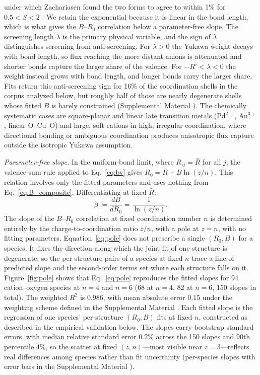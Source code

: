 \documentclass[aps,prmaterials,twocolumn,10pt,superscriptaddress,floatfix]{revtex4-2}
\newcommand{\runinsec}[1]{\medskip\emph{#1}}
\begin{document}
under which Zachariasen found the two forms to agree to within 1\%
for $0.5<S<2$ \cite{Zachariasen1978}.  We retain the exponential
because it is linear in the bond length, which is what gives the
$B$--$R_0$ correlation below a parameter-free slope.  The screening
length $\lambda$ is the
primary physical variable, and the sign of $\lambda$ distinguishes
screening from anti-screening.  For $\lambda>0$ the Yukawa weight
decays with bond length, so flux reaching the more distant anions is
attenuated and shorter bonds capture the larger share of the valence.
For $-R'<\lambda<0$ the weight instead grows with bond length, and
longer bonds carry the larger share.  Fits return this anti-screening
sign for 16\% of the coordination shells in the corpus analyzed below,
but roughly half of those are nearly degenerate shells whose fitted
$B$ is barely constrained (Supplemental Material \cite{suppmat}).  The
chemically systematic cases are square-planar and linear late
transition metals (Pd$^{2+}$, Au$^{3+}$, linear O--Cu--O) and large,
soft cations in high, irregular coordination, where directional
bonding or ambiguous coordination produces anisotropic flux capture
outside the isotropic Yukawa assumption.

\runinsec{Parameter-free slope.} In the uniform-bond limit, where
$R_{ij}=\bar R$ for all $j$, the valence-sum rule applied to
Eq.~\eqref{eq:bv} gives $R_0=\bar R+B\ln(z/n)$.  This relation
involves only the fitted parameters and uses nothing from
Eq.~\eqref{eq:B_composite}.  Differentiating at fixed $\bar R$:
\begin{equation}\label{eq:pole}
\beta := \frac{dB}{dR_0} = \frac{1}{\ln(z/n)}.
\end{equation}
The slope of the $B$--$R_0$ correlation at fixed
coordination number $n$ is determined entirely by the charge-to-coordination
ratio $z/n$, with a pole at $z=n$, with no fitting parameters.
Equation~\eqref{eq:pole} does not prescribe a single $(R_0,B)$ for
a species.  It fixes the direction along which the joint fit of one
structure is degenerate, so the per-structure pairs of a species at
fixed $n$ trace a line of predicted slope and the second-order terms
set where each structure falls on it.
Figure~\ref{fig:pole} shows that Eq.~\eqref{eq:pole} reproduces the
fitted slopes for 94 cation--oxygen species at $n=4$ and $n=6$ (68 at
$n=4$, 82 at $n=6$, 150 slopes in total).  The weighted $R^2$ is
$0.986$, with mean absolute error $0.15$ under the weighting scheme
defined in the Supplemental Material \cite{suppmat}.  Each fitted
slope is the regression of one species' per-structure $(R_0,B)$ fits at fixed $n$,
constructed as described in the empirical validation below.  The
slopes carry bootstrap standard errors, with median relative
standard error $0.2\%$ across the 150 slopes and 90th percentile
$4\%$, so the scatter at fixed $(z,n)$---most visible near
$z=3$---reflects real differences among species rather than fit
uncertainty (per-species slopes with error bars in the Supplemental
Material \cite{suppmat}).
\end{document}
